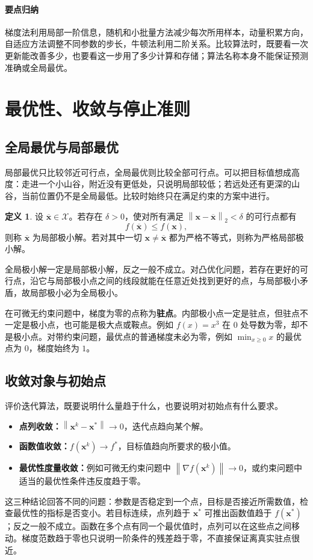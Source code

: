 \documentclass[UTF8,fontset=fandol,a4paper,12pt]{ctexart}
\newcommand{\vx}{\boldsymbol x}
\newcommand{\norm}[1]{\left\lVert#1\right\rVert}
\theoremstyle{definition}
\newtheorem{definition}{定义}[section]
\begin{document}
\paragraph{要点归纳}
梯度法利用局部一阶信息，随机和小批量方法减少每次所用样本，动量积累方向，自适应方法调整不同参数的步长，牛顿法利用二阶关系。比较算法时，既要看一次更新能改善多少，也要看这一步用了多少计算和存储；算法名称本身不能保证预测准确或全局最优。

\section{最优性、收敛与停止准则}\label{sec:convergence}
\subsection{全局最优与局部最优}
局部最优只比较邻近可行点，全局最优则比较全部可行点。可以把目标值想成高度：走进一个小山谷，附近没有更低处，只说明局部较低；若远处还有更深的山谷，当前位置仍不是全局最低。比较时始终只在满足约束的方案中进行。
\begin{definition}
设 $\overline{\vx}\in\mathcal X$。若存在 $\delta>0$，使对所有满足 $\norm{\vx-\overline{\vx}}_2<\delta$ 的可行点都有
\[
 f(\overline{\vx})\le f(\vx),
\]
则称 $\overline{\vx}$ 为局部极小解。若对其中一切 $\vx\ne\overline{\vx}$ 都为严格不等式，则称为严格局部极小解。
\end{definition}
全局极小解一定是局部极小解，反之一般不成立。对凸优化问题，若存在更好的可行点，沿它与局部极小点之间的线段就能在任意近处找到更好的点，与局部极小矛盾，故局部极小必为全局极小。

在可微无约束问题中，梯度为零的点称为\textbf{驻点}。内部极小点一定是驻点，但驻点不一定是极小点，也可能是极大点或鞍点。例如 $f(x)=x^3$ 在 $0$ 处导数为零，却不是极小点。对带约束问题，最优点的普通梯度未必为零，例如 $\min_{x\ge0}x$ 的最优点为 $0$，梯度始终为 $1$。

\subsection{收敛对象与初始点}
评价迭代算法，既要说明什么量趋于什么，也要说明对初始点有什么要求。
\begin{itemize}
\item \textbf{点列收敛：}$\norm{\vx^k-\vx^*}\to0$，迭代点趋向某个解。
\item \textbf{函数值收敛：}$f(\vx^k)\to f^*$，目标值趋向所要求的极小值。
\item \textbf{最优性度量收敛：}例如可微无约束问题中 $\norm{\nabla f(\vx^k)}\to0$，或约束问题中适当的最优性条件违反度趋于零。
\end{itemize}
这三种结论回答不同的问题：参数是否稳定到一个点，目标是否接近所需数值，检查最优性的指标是否变小。若目标连续，点列趋于 $\vx^*$ 可推出函数值趋于 $f(\vx^*)$；反之一般不成立。函数在多个点有同一个最优值时，点列可以在这些点之间移动。梯度范数趋于零也只说明一阶条件的残差趋于零，不直接保证离真实驻点很近。
\end{document}
